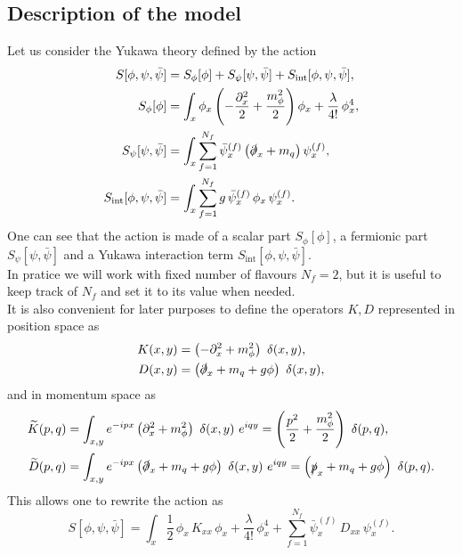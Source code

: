 \subsection{Description of the model}
Let us consider the Yukawa theory defined by the action
\begin{equation}
\begin{aligned}
    S[\phi,\psi,\bar\psi] &= S_\phi[\phi] + S_\psi[\psi, \bar\psi] + S_\text{int}[\phi, \psi, \bar\psi], \\
     S_\phi[\phi] &= \int_x \phi_x \left(-\frac{\partial^2_x}{2} + \frac{m_\phi^2}{2}\right) \phi_x + \frac{\lambda}{4!} \, \phi_x^4, \\
     S_\psi[\psi, \bar\psi] &= \int_x \sum_{f=1}^{N_f} \bar \psi_x^{(f)} \left(\slashed{\partial}_x + m_q \right) \psi_x^{(f)}, \\
     S_\text{int}[\phi, \psi, \bar\psi] &= \int_x \sum_{f=1}^{N_f} g \, \bar \psi_x^{(f)} \, \phi_x \, \psi_x^{(f)}.
    \label{eq:full_action_continuum}
\end{aligned}
\end{equation}
One can see that the action is made of a scalar part $S_\phi[\phi]$, a fermionic part $S_\psi[\psi, \bar\psi]$ and a Yukawa interaction term $S_\text{int}[\phi, \psi, \bar\psi]$. \\
In pratice we will work with fixed number of flavours $N_f = 2$, but it is useful to keep track of $N_f$ and set it to its value when needed. \\
It is also convenient for later purposes to define the operators $K, D$ represented in position space as 
\begin{equation}
    \begin{aligned}
        K(x, y) &=  \left(-\partial^2_x + m_\phi^2\right) \ \delta(x,y), \\
        D(x, y) &= \left(\slashed{\partial}_x + m_q + g\phi \right) \ \delta(x,y),
    \end{aligned}
    \label{eq:definition_kinetic_terms_continuum_position}
\end{equation}
and in momentum space as
\begin{equation}
    \begin{aligned}
        \widetilde{K}(p, q) &=  \int_{x,y} e^{-ipx} \left(\partial^2_x + m_\phi^2\right) \ \delta(x,y) \ e^{iqy} = \left(\frac{p^2}{2} + \frac{m_\phi^2}{2}\right) \ \delta(p,q), \\
        \widetilde{D}(p, q) &= \int_{x,y} e^{-ipx} \left(\slashed{\partial}_x + m_q + g\phi \right) \ \delta(x,y) \ e^{iqy} = \left(\slashed{p}_x + m_q + g\phi \right) \ \delta(p,q).
    \end{aligned}
    \label{eq:definition_kinetic_terms_continuum_momentum}
\end{equation}
This allows one to rewrite the action as
\begin{equation*}
    S[\phi,\psi,\bar\psi] = \int_x \frac{1}{2} \, \phi_x \, K_{xx} \, \phi_x + \frac{\lambda}{4!} \, \phi_x^4 + \sum_{f=1}^{N_f} \bar\psi_x^{(f)} \, D_{xx} \, \psi_x^{(f)}.
\end{equation*}

